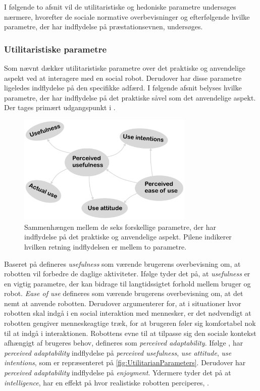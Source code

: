 I følgende to afsnit vil de utilitaristiske og hedoniske parametre undersøges nærmere, hvorefter de sociale normative overbevisninger og efterfølgende hvilke parametre, der har indflydelse på præstationsevnen, undersøges.
%   
\vfill
\subsubsection*{Utilitaristiske parametre}
\label{InteraktionSocialeRobotterParametreUtilitarian}
%
Som nævnt dækker utilitaristiske parametre over det praktiske og anvendelige aspekt ved at interagere med en social robot. Derudover har disse parametre ligeledes indflydelse på den specifikke adfærd. I følgende afsnit belyses hvilke parametre, der har indflydelse på det praktiske såvel som det anvendelige aspekt. Der tages primært udgangspunkt i \textcite[s. 1477]{PDF:SharingALifeHarvey}.
%
\begin{figure}[H]
\centering
\includegraphics[width = 0.75\textwidth]{Figure/UtilitarianParameters} 
\caption{Sammenhængen mellem de seks forskellige parametre, der har indflydelse på det praktiske og anvendelige aspekt. Pilene indikerer hvilken retning indflydelsen er mellem to parametre.}
\label{fig:UtilitarianParameters}
\end{figure}
\noindent 
%
Baseret på \textcite[s. 1477]{PDF:SharingALifeHarvey} defineres \textit{usefulness} som værende brugerens overbevisning om, at robotten vil forbedre de daglige aktiviteter. Ifølge \textcite[s. 11]{PDF:SharingALifeHarvey} tyder det på, at \textit{usefulness} er en vigtig parametre, der kan bidrage til langtidssigtet forhold mellem bruger og robot. \textit{Ease of use} defineres som værende brugerens overbevisning om, at det nemt at anvende robotten. Derudover argumenterer \textcite[s. 1477]{PDF:SharingALifeHarvey} for, at i situationer hvor robotten skal indgå i en social interaktion med mennesker, er det nødvendigt at robotten gengiver menneskeagtige træk, for at brugeren føler sig komfortabel nok til at indgå i interaktionen. Robottens evne til at tilpasse sig den sociale kontekst afhængigt af brugeres behov, defineres som \textit{perceived adaptability}. Ifølge \textcite[s. 1477]{PDF:SharingALifeHarvey}, har \textit{perceived adaptability} indflydelse på \textit{perceived usefulness}, \textit{use attitude}, \textit{use intentions}, som er repræsenteret på \autoref{fig:UtilitarianParameters}. Derudover har \textit{perceived adaptability} indflydelse på \textit{enjoyment}. Ydermere tyder det på at \textit{intelligence}, har en effekt på hvor realistiske robotten perciperes, \parencite[s. 1477]{PDF:ExploringInfluencingVariable}.   
%

